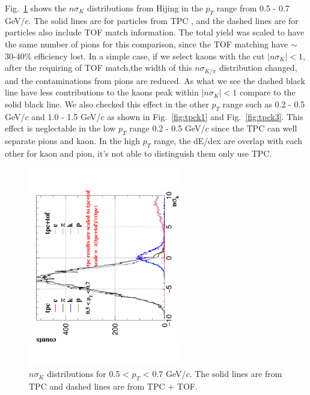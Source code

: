\documentclass[a4paper]{article}
\begin{document}
Fig.~\ref{fig:tpck2} shows the $n\sigma_{K}$ distributions from Hijing in the $p_{T}$ range from 0.5 - 0.7 GeV/$c$. The solid lines are for particles from TPC , and the dashed lines are for particles also include TOF match information. The total yield was scaled to have the same number of pions for this comparison, since the TOF matching have $\sim$30-40\% efficiency lost. In a simple case, if we select kaons with the cut $|n\sigma_{K}| < 1 $, after the requiring of TOF match,the width of this $n\sigma_{K/\pi}$ distribution changed, and the contaminations from pions are reduced. As what we see the dashed black line have less contributions to the kaons peak within $|n\sigma_{K}| < 1$ compare to the solid black line. We also checked this effect in the other $p_{T}$ range such as 0.2 - 0.5 GeV/$c$ and 1.0 - 1.5 GeV/$c$ as shown in Fig.~\ref{fig:tpck1} and Fig.~\ref{fig:tpck3}. This effect is neglectable in the low $p_{T}$ range 0.2 - 0.5 GeV/$c$ since the TPC can well separate pions and kaon. In the high $p_{T}$ range, the dE/dex are overlap with each other for kaon and pion, it's not able to distinguish them only use TPC.

\begin{figure}[htbp]
\centering
\includegraphics[keepaspectratio,width=0.6\textwidth,angle=-90]{fig/tofMatch_Hijing_nSigmaK.pdf}
\caption{$n\sigma_{K}$ distributions for 0.5 < $p_T$ < 0.7 GeV/$c$. The solid lines are from TPC and dashed lines are from TPC + TOF.}
\label{fig:tpck2}
\end{figure}
\end{document}
